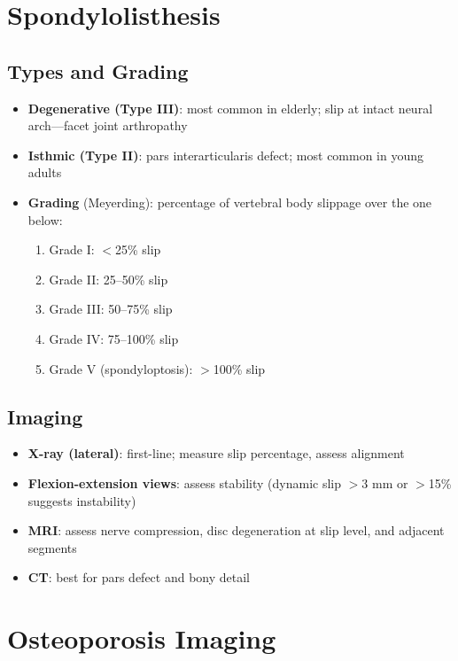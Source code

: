 \section{Spondylolisthesis}

\subsection{Types and Grading}
\begin{itemize}
  \item \textbf{Degenerative (Type III)}: most common in elderly; slip at intact neural arch---facet joint arthropathy
  \item \textbf{Isthmic (Type II)}: pars interarticularis defect; most common in young adults
  \item \textbf{Grading} (Meyerding): percentage of vertebral body slippage over the one below:
    \begin{enumerate}
      \item Grade I: $<$25\% slip
      \item Grade II: 25--50\% slip
      \item Grade III: 50--75\% slip
      \item Grade IV: 75--100\% slip
      \item Grade V (spondyloptosis): $>$100\% slip
    \end{enumerate}
\end{itemize}

\subsection{Imaging}
\begin{itemize}
  \item \textbf{X-ray (lateral)}: first-line; measure slip percentage, assess alignment
  \item \textbf{Flexion-extension views}: assess stability (dynamic slip $>$3 mm or $>$15\% suggests instability)
  \item \textbf{MRI}: assess nerve compression, disc degeneration at slip level, and adjacent segments
  \item \textbf{CT}: best for pars defect and bony detail
\end{itemize}

\section{Osteoporosis Imaging}

